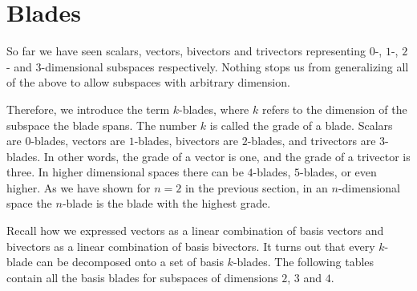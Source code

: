 \documentclass[10pt]{report}
\begin{document}
\newpage

\section{Blades}

So far we have seen scalars, vectors, bivectors and trivectors
representing $0$-, $1$-, $2$- and $3$-dimensional subspaces
respectively. Nothing stops us from generalizing all of the above
to allow subspaces with arbitrary dimension.

Therefore, we introduce the term $k$-blades, where $k$ refers to
the dimension of the subspace the blade spans. The number $k$ is
called the grade of a blade. Scalars are $0$-blades, vectors are
$1$-blades, bivectors are $2$-blades, and trivectors are
$3$-blades. In other words, the grade of a vector is one, and the
grade of a trivector is three. In higher dimensional spaces there
can be $4$-blades, $5$-blades, or even higher. As we have shown
for $n=2$ in the previous section, in an $n$-dimensional space the
$n$-blade is the blade with the highest grade.

Recall how we expressed vectors as a linear combination of basis
vectors and bivectors as a linear combination of basis bivectors.
It turns out that every $k$-blade can be decomposed onto a set of
basis $k$-blades. The following tables contain all the basis
blades for subspaces of dimensions $2$, $3$ and $4$.
\end{document}
